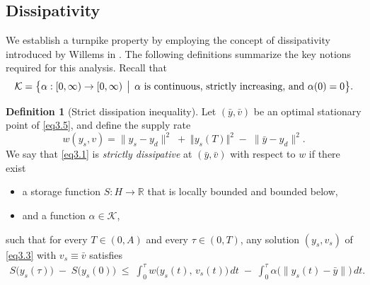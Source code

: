 \documentclass[10pt, a4]{amsart}
\theoremstyle{plain}
\theoremstyle{definition}
\newtheorem{definition}[lemma]{Definition}
\theoremstyle{remark}
\numberwithin{equation}{section}
\def\to{\rightarrow}
\begin{document}
\subsection{Dissipativity}
  We establish a turnpike property by employing the concept of dissipativity introduced by Willems in \cite{ref75}. The following definitions summarize the key notions required for this analysis. Recall that
$$
 \mathcal{K} = \bigl\{\alpha:[0,\infty)\to[0,\infty)\,\bigm|\,\alpha\text{ is continuous, strictly increasing, and }\alpha(0)=0\bigr\}.
$$
\begin{definition}[Strict dissipation inequality]\label{d6.1}
Let \((\bar y,\bar v)\) be an optimal stationary point of \eqref{eq3.5}, and define the supply rate
\[
w(y_s,v)
=\bigl\|y_s - y_d\bigr\|^2
\;+\;\bigl\Vert y_s(T)\bigr\Vert^2
\;-\;\bigl\|\bar y - y_d\bigr\|^2.
\]
We say that \eqref{eq3.1} is \emph{strictly dissipative} at \((\bar y,\bar v)\) with respect to \(w\) if there exist
\begin{itemize}
  \item a storage function \(S\colon H\to\mathbb{R}\) that is locally bounded and bounded below,
  \item and a function \(\alpha\in\mathcal{K}\),
\end{itemize}
such that for every \(T\in(0,A)\) and every \(\tau\in(0,T)\), any solution \((y_s,v_s)\) of \eqref{eq3.3} with \(v_s\equiv\bar v\) satisfies
\begin{align}
    S\bigl(y_s(\tau)\bigr)\;-\;S\bigl(y_s(0)\bigr)
\;\le\;
\int_{0}^{\tau} w\bigl(y_s(t),\,v_s(t)\bigr)\,dt
\;-\;
\int_{0}^{\tau} \alpha\bigl(\|y_s(t)-\bar y\|\bigr)\,dt.
\end{align}
\end{definition}
\end{document}
